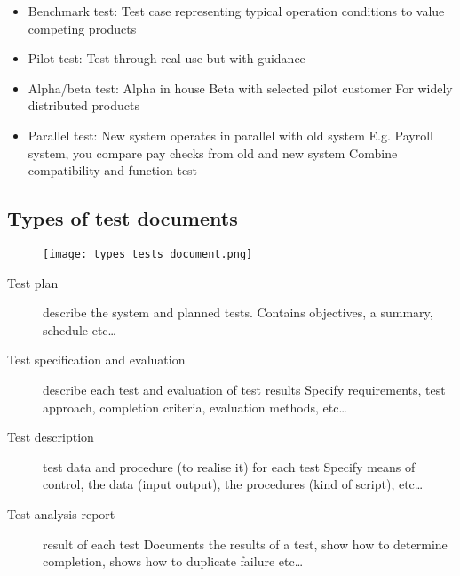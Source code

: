 \begin{itemize}
    \item Benchmark test:
        \subitem{} Test case representing typical operation conditions to value competing products
    \item Pilot test:
        \subitem{} Test through real use but with guidance
    \item Alpha/beta test:
        \subitem{} Alpha in house
        \subitem{} Beta with selected pilot customer
        \subitem{} For widely distributed products
    \item Parallel test:
        \subitem{} New system operates in parallel with old system
        \subitem{} E.g. Payroll system, you compare pay checks from old and new system
        \subitem{} Combine compatibility and function test
\end{itemize}

\subsection{Types of test documents}

\begin{figure}[!ht]
    \centering
    \texttt{[image: types\_tests\_document.png]}
\end{figure}

\begin{description}
    \item[Test plan] describe the system and planned tests.
        \subitem{} Contains objectives, a summary, schedule etc\ldots
    \item[Test specification and evaluation] describe each test and evaluation of test results
        \subitem{} Specify requirements, test approach, completion criteria, evaluation methods, etc\ldots
    \item[Test description] test data and procedure (to realise it) for each test
        \subitem{} Specify means of control, the data (input output), the procedures (kind of script), etc\ldots
    \item[Test analysis report] result of each test
        \subitem{} Documents the results of a test, show how to determine completion, shows how to duplicate failure etc\ldots
\end{description}

